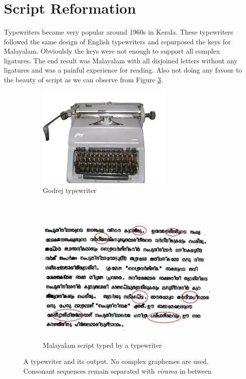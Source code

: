 \documentclass[10pt]{article}
\begin{document}
\section{Script Reformation}

\paragraph{}
Typewriters became very popular around 1960s in Kerala. These typewriters followed the same design of English typewriters and repurposed the keys for Malayalam. Obvioulsly the keys were not enough to support all complex ligatures. The end result was Malayalam with all disjoined letters without any ligatures and was a painful experience for reading. Also not doing any favour to the beauty of script as we can observe from Figure \ref{typewriter}.

\begin{figure}[h!]
	\centering
	\begin{subfigure}{.7\textwidth}
		\centering
		\includegraphics[width=\linewidth, height=5cm]{images/godrej-typewriter.jpg}
		\caption{Godrej typewriter}
		\label{godrej}
	\end{subfigure}%
	\\
	\begin{subfigure}{\textwidth}
		\centering
		\includegraphics[width=\linewidth,height=6.5cm]{images/typewritertext4.jpg}
		\caption{Malayalam script typed by a typewriter}
		\label{typewritertext}
	\end{subfigure}
	\caption{A typewriter and its output. No complex graphemes are used. Consonant sequences remain separated with \textit{virama} in between}
	\label{typewriter}
\end{figure}
\end{document}
